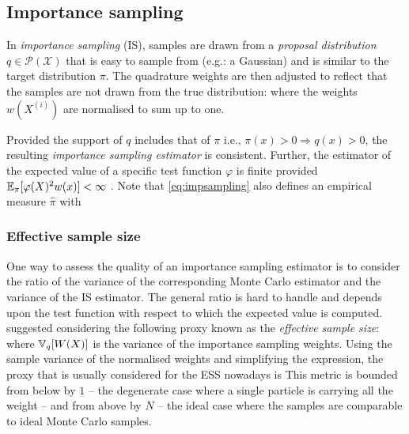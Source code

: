 \subsection{Importance sampling}
In \emph{importance sampling} (IS), samples are drawn from a \emph{proposal distribution} $q\in\mathcal P(\mathcal X)$ that is easy to sample from (e.g.: a Gaussian) and is similar to the target distribution $\pi$. 
The quadrature weights are then adjusted to reflect that the samples are not drawn from the true distribution:
%
%
where the weights $w(X^{(i)})$ are normalised to sum up to one.

Provided the support of $q$ includes that of $\pi$ i.e., $\pi(x)>0\Rightarrow q(x)>0$, the resulting \emph{importance sampling estimator} is consistent. Further, the estimator of the expected value of a specific test function $\varphi$ is finite provided $\mathbb E_{\pi}[\varphi(X)^{2}w(x)]<\infty$ \citep[chapter 3.3]{robert04}. Note that \eqref{eq:impsampling} also defines an empirical measure $\hat\pi$ with
%
%
 

\subsubsection{Effective sample size}
One way to assess the quality of an importance sampling estimator is to consider the ratio of the variance of the corresponding Monte Carlo estimator and the variance of the IS estimator. The general ratio is hard to handle and depends upon the test function with respect to which the expected value is computed. \citet{kong92} suggested considering the following proxy known as the \emph{effective sample size}:
%
%
where $\mathbb V_{q}[W(X)]$ is the variance of the importance sampling weights. Using the sample variance of the normalised weights and simplifying the expression, the proxy that is usually considered for the ESS nowadays is
%
%
This metric is bounded from below by $1$ -- the degenerate case where a single particle is carrying all the weight -- and from above by $N$ -- the ideal case where the samples are comparable to ideal Monte Carlo samples. 

